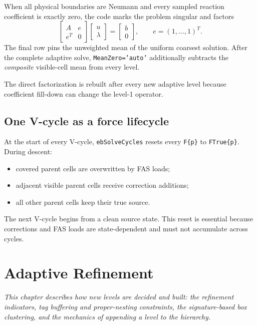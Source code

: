 \documentclass[11pt,oneside,openany]{book}
\newcommand{\code}[1]{\textnormal{\texttt{#1}}}
\begin{document}
When all physical boundaries are Neumann and every sampled reaction coefficient is exactly zero, the code marks the problem singular and factors
\begin{equation}
 \begin{bmatrix}
 A & e\\ e^T & 0
 \end{bmatrix}
 \begin{bmatrix}u\\\lambda\end{bmatrix}
 =\begin{bmatrix}b\\0\end{bmatrix},
 \qquad e=(1,\ldots,1)^T.
 \label{eq:kkt}
\end{equation}
The final row pins the unweighted mean of the uniform coarsest solution. After the complete adaptive solve, \code{MeanZero='auto'} additionally subtracts the \emph{composite} visible-cell mean from every level.

The direct factorization is rebuilt after every new adaptive level because coefficient fill-down can change the level-1 operator.

\section{One V-cycle as a force lifecycle}
At the start of every V-cycle, \code{ebSolveCycles} resets every \code{F\{p\}} to \code{FTrue\{p\}}. During descent:
\begin{itemize}
\item covered parent cells are overwritten by FAS loads;
\item adjacent visible parent cells receive correction additions;
\item all other parent cells keep their true source.
\end{itemize}
The next V-cycle begins from a clean source state. This reset is essential because corrections and FAS loads are state-dependent and must not accumulate across cycles.


\chapter{Adaptive Refinement}
\label{chap:adaptivity}

\emph{This chapter describes how new levels are decided and built: the refinement indicators, tag buffering and proper-nesting constraints, the signature-based box clustering, and the mechanics of appending a level to the hierarchy.}
\end{document}
